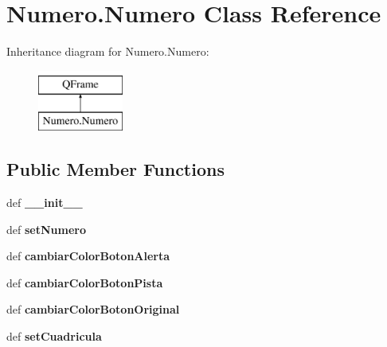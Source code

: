 \hypertarget{class_numero_1_1_numero}{\section{Numero.\-Numero Class Reference}
\label{class_numero_1_1_numero}
}
Inheritance diagram for Numero.\-Numero\-:\begin{figure}[H]
\begin{center}
\leavevmode
\includegraphics[height=2.000000cm]{class_numero_1_1_numero}
\end{center}
\end{figure}
\subsection*{Public Member Functions}
\begin{DoxyCompactItemize}
\item 
\hypertarget{class_numero_1_1_numero_a9f17c96d676757e0b155e88537e3abb3}{def {\bfseries \-\_\-\-\_\-init\-\_\-\-\_\-}}\label{class_numero_1_1_numero_a9f17c96d676757e0b155e88537e3abb3}

\item 
\hypertarget{class_numero_1_1_numero_a818d0986e959bc7475473acba2c9db52}{def {\bfseries set\-Numero}}\label{class_numero_1_1_numero_a818d0986e959bc7475473acba2c9db52}

\item 
\hypertarget{class_numero_1_1_numero_ae0fd65c2f86d7dd2bb094b35fcd85ab6}{def {\bfseries cambiar\-Color\-Boton\-Alerta}}\label{class_numero_1_1_numero_ae0fd65c2f86d7dd2bb094b35fcd85ab6}

\item 
\hypertarget{class_numero_1_1_numero_af740b535557fcd6bde1e43888e05a2fa}{def {\bfseries cambiar\-Color\-Boton\-Pista}}\label{class_numero_1_1_numero_af740b535557fcd6bde1e43888e05a2fa}

\item 
\hypertarget{class_numero_1_1_numero_ab1f9269d0aa574800961da32f7f95f16}{def {\bfseries cambiar\-Color\-Boton\-Original}}\label{class_numero_1_1_numero_ab1f9269d0aa574800961da32f7f95f16}

\item 
\hypertarget{class_numero_1_1_numero_a6ec5c677a3f7d8166aacf84b102eee0d}{def {\bfseries set\-Cuadricula}}\label{class_numero_1_1_numero_a6ec5c677a3f7d8166aacf84b102eee0d}

\end{DoxyCompactItemize}
